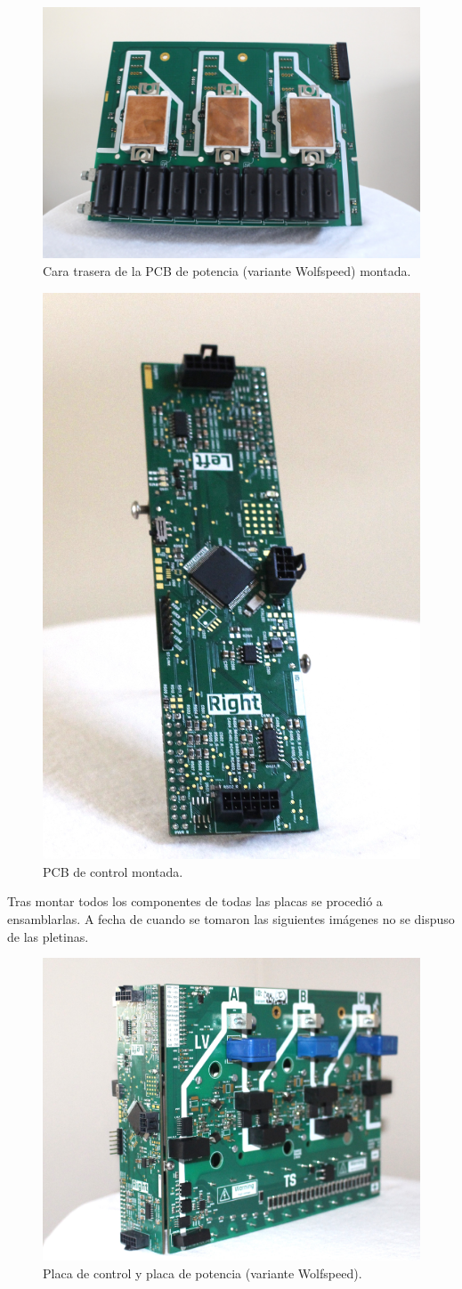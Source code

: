 \begin{figure}[H]
	\centering
	\includegraphics[width=0.7\linewidth]{fig/assembly8}
	\caption{Cara trasera de la PCB de potencia (variante Wolfspeed) montada.}
\end{figure}


\begin{figure}[H]
	\centering
	\includegraphics[width=0.5\linewidth]{fig/assembly9}
	\caption{PCB de control montada.}
\end{figure}


Tras montar todos los componentes de todas las placas se procedió a ensamblarlas. A fecha de cuando se tomaron las siguientes imágenes no se dispuso de las pletinas.

\begin{figure}[H]
	\centering
	\includegraphics[width=0.7\linewidth]{fig/assembly6}
	\caption{Placa de control y placa de potencia (variante Wolfspeed).}
\end{figure}


